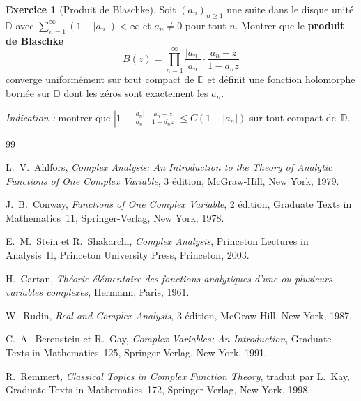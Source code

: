 \documentclass[12pt,a4paper,openany]{book}
\theoremstyle{definition}
\newtheorem{exercice}{Exercice}[chapter]
\theoremstyle{plain}
\theoremstyle{remark}
\newcommand{\D}{\mathbb{D}}
\newcommand{\abs}[1]{\left|#1\right|}
\newcommand{\conj}[1]{\overline{#1}}
\begin{document}
\begin{exercice}[Produit de Blaschke]\label{exo:blaschke}
Soit $(a_n)_{n\geq 1}$ une suite dans le disque unité $\D$ avec
$\sum_{n=1}^{\infty}(1 - \abs{a_n}) < \infty$ et $a_n \neq 0$ pour tout $n$.
Montrer que le \textbf{produit de Blaschke}
\[
  B(z) = \prod_{n=1}^{\infty} \frac{\abs{a_n}}{a_n} \cdot \frac{a_n - z}{1 - \conj{a_n} z}
\]
converge uniformément sur tout compact de $\D$ et définit une fonction holomorphe
bornée sur $\D$ dont les zéros sont exactement les $a_n$.

\textit{Indication :} montrer que $\abs{1 - \frac{\abs{a_n}}{a_n} \cdot
\frac{a_n - z}{1 - \conj{a_n}z}} \leq C(1 - \abs{a_n})$ sur tout compact
de~$\D$.
\end{exercice}


\begin{thebibliography}{99}

L.~V.~Ahlfors,
\textit{Complex Analysis: An Introduction to the Theory of Analytic Functions
of One Complex Variable},
3\ieme{} édition, McGraw-Hill, New York, 1979.

J.~B.~Conway,
\textit{Functions of One Complex Variable},
2\ieme{} édition, Graduate Texts in Mathematics~11,
Springer-Verlag, New York, 1978.

E.~M.~Stein et R.~Shakarchi,
\textit{Complex Analysis},
Princeton Lectures in Analysis~II,
Princeton University Press, Princeton, 2003.

H.~Cartan,
\textit{Théorie élémentaire des fonctions analytiques d'une ou plusieurs
variables complexes},
Hermann, Paris, 1961.

W.~Rudin,
\textit{Real and Complex Analysis},
3\ieme{} édition, McGraw-Hill, New York, 1987.

C.~A.~Berenstein et R.~Gay,
\textit{Complex Variables: An Introduction},
Graduate Texts in Mathematics~125,
Springer-Verlag, New York, 1991.

R.~Remmert,
\textit{Classical Topics in Complex Function Theory},
traduit par L.~Kay, Graduate Texts in Mathematics~172,
Springer-Verlag, New York, 1998.

\end{thebibliography}

\printindex
\end{document}
